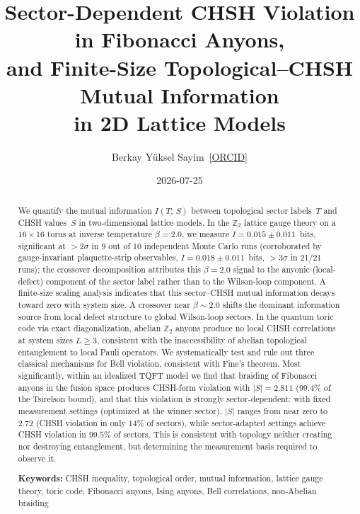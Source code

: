 \documentclass[aps,pra,twocolumn,superscriptaddress,showpacs,floatfix]{revtex4-2}
\newcommand{\Ztwo}{\mathbb{Z}_2}
\newcommand{\MI}{I(T;\,S)}
\begin{document}
\setcounter{secnumdepth}{3}

\title{Sector-Dependent CHSH Violation in Fibonacci Anyons,\\
and Finite-Size Topological--CHSH Mutual Information\\
in 2D Lattice Models}

\author{Berkay Y\"uksel Sayim\,%
  \href{https://orcid.org/0009-0004-4993-7352}{[ORCID]}}

\date{2026-07-25}

\begin{abstract}
We quantify the mutual information $\MI$ between topological sector labels~$T$
and CHSH values~$S$ in two-dimensional lattice models. In the $\Ztwo$ lattice gauge
theory on a $16\times 16$ torus at inverse temperature $\beta = 2.0$, we measure
$I = 0.015 \pm 0.011$~bits, significant at ${>}2\sigma$ in 9 out of 10
independent Monte Carlo runs (corroborated by gauge-invariant
plaquette-strip observables, $I = 0.018 \pm 0.011$~bits,
${>}3\sigma$ in 21/21 runs); the crossover decomposition attributes this
$\beta = 2.0$ signal to the anyonic (local-defect) component of the sector
label rather than to the Wilson-loop component. A finite-size scaling
analysis indicates that this sector--CHSH mutual information decays toward
zero with system size. A crossover near $\beta \sim 2.0$ shifts the dominant
information source from local defect structure to global Wilson-loop sectors. In the quantum toric code via exact
diagonalization, abelian $\Ztwo$ anyons produce no local CHSH
correlations at system sizes $L \geq 3$, consistent with the inaccessibility
of abelian topological entanglement to local Pauli operators. We systematically test and
rule out three classical mechanisms for Bell violation, consistent with Fine's
theorem. Most significantly, within an idealized TQFT model we find that braiding of
Fibonacci anyons in the fusion space produces CHSH-form violation with
$|S| = 2.811$ (99.4\% of the
Tsirelson bound), and that this violation is strongly sector-dependent: with
fixed measurement settings (optimized at the winner sector), $|S|$ ranges from
near zero to $2.72$ (CHSH violation in only $14\%$ of sectors), while
sector-adapted settings achieve CHSH violation in $99.5\%$ of sectors.
This is consistent with topology neither creating nor destroying entanglement,
but determining the measurement basis required to observe it.

\vspace{4pt}
\noindent\textbf{Keywords:} CHSH inequality, topological order, mutual
information, lattice gauge theory, toric code, Fibonacci anyons, Ising anyons,
Bell correlations, non-Abelian braiding
\end{abstract}
\end{document}
